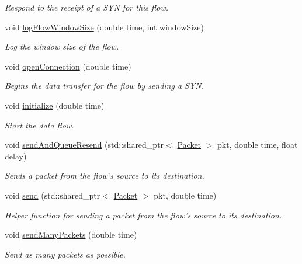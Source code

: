 \begin{DoxyCompactItemize}
\begin{DoxyCompactList}\small\item\em \-Respond to the receipt of a \-S\-Y\-N for this flow. \end{DoxyCompactList}\item 
void \hyperlink{classFlow_a11e680564ffab501382cf02ed511668a}{log\-Flow\-Window\-Size} (double time, int window\-Size)
\begin{DoxyCompactList}\small\item\em \-Log the window size of the flow. \end{DoxyCompactList}\item 
void \hyperlink{classFlow_abda1a17915ccd01b4f31597ad962b3ab}{open\-Connection} (double time)
\begin{DoxyCompactList}\small\item\em \-Begins the data transfer for the flow by sending a \-S\-Y\-N. \end{DoxyCompactList}\item 
void \hyperlink{classFlow_a1076308c9b3a11a1e0bdea4c7b4c2966}{initialize} (double time)
\begin{DoxyCompactList}\small\item\em \-Start the data flow. \end{DoxyCompactList}\item 
void \hyperlink{classFlow_a2a9cb972dfe6f6f03543073b575d65c6}{send\-And\-Queue\-Resend} (std\-::shared\-\_\-ptr$<$ \hyperlink{classPacket}{\-Packet} $>$ pkt, double time, float delay)
\begin{DoxyCompactList}\small\item\em \-Sends a packet from the flow's source to its destination. \end{DoxyCompactList}\item 
void \hyperlink{classFlow_a5a547ae4185337bf7790f9ace391ac48}{send} (std\-::shared\-\_\-ptr$<$ \hyperlink{classPacket}{\-Packet} $>$ pkt, double time)
\begin{DoxyCompactList}\small\item\em \-Helper function for sending a packet from the flow's source to its destination. \end{DoxyCompactList}\item 
void \hyperlink{classFlow_a792deb9bffc1a4020e09275f037fcc4c}{send\-Many\-Packets} (double time)
\begin{DoxyCompactList}\small\item\em \-Send as many packets as possible. \end{DoxyCompactList}\item 

\end{DoxyCompactItemize}
